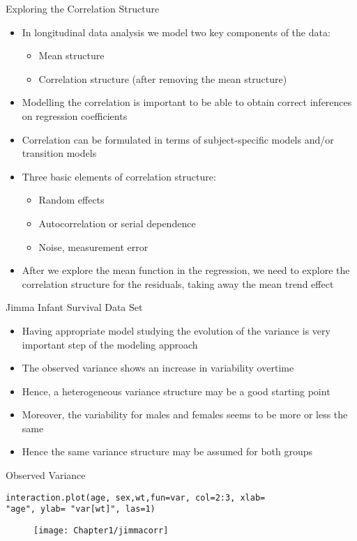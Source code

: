 \documentclass{beamer}
\begin{document}
\begin{frame}{Exploring the Correlation Structure}
\begin{itemize}
\item In longitudinal data analysis we model two key components of the data:
\begin{itemize}
	\item Mean structure
	\item Correlation structure (after removing the mean structure) 
\end{itemize} 
\item Modelling the correlation is important to be able to obtain correct inferences on regression coefficients 
\item Correlation can be formulated in terms of subject-specific models and/or transition models
\item Three basic elements of correlation structure:
\begin{itemize}
	\item Random effects 
	\item Autocorrelation or serial dependence 
	\item Noise, measurement error
\end{itemize}

\item After we explore the mean function in the regression, we need to explore the correlation structure for the residuals, taking away the mean trend effect

\end{itemize}
\end{frame}

\begin{frame}{Jimma Infant Survival Data Set}
\begin{itemize}
\item Having appropriate model studying the evolution of the variance is very important step of the modeling approach
\item The observed variance shows an increase in variability overtime
\item Hence, a heterogeneous variance structure may be a good starting point
\item Moreover, the variability for males and females seems to be more or less the same
\item Hence the same variance structure may be assumed for both groups
\end{itemize}
\end{frame}

\begin{frame}[fragile]{Observed Variance}
\begin{verbatim}
interaction.plot(age, sex,wt,fun=var, col=2:3, xlab= 
"age", ylab= "var[wt]", las=1)
\end{verbatim}
	\begin{figure}[h!]
		\centering
		\texttt{[image: Chapter1/jimmacorr]}
	\end{figure}
\end{frame}
\end{document}
